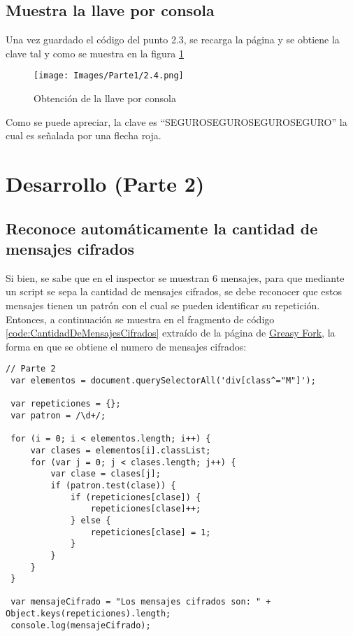 \documentclass[letter,12pt]{article}
\newcounter{codecount}
\begin{document}
\clearpage

\subsection{Muestra la llave por consola}

Una vez guardado el código del punto 2.3, se recarga la página y se obtiene la clave tal y como se muestra en la figura \ref{fig:2.4}

\begin{figure}[H]
    \centering
    \texttt{[image: Images/Parte1/2.4.png]}
    \caption{Obtención de la llave por consola}
    \label{fig:2.4}
\end{figure}

Como se puede apreciar, la clave es ``SEGUROSEGUROSEGUROSEGURO'' la cual es señalada por una flecha roja.

\clearpage

\section{Desarrollo (Parte 2)}

\subsection{Reconoce automáticamente la cantidad de mensajes cifrados}

Si bien, se sabe que en el inspector se muestran 6 mensajes, para que mediante un script se sepa la cantidad de mensajes cifrados, se debe reconocer que estos mensajes tienen un patrón con el cual se pueden identificar su repetición. Entonces, a continuación se muestra en el fragmento de código \ref{code:CantidadDeMensajesCifrados} extraído de la página de \href{https://greasyfork.org/es/scripts/479454-cryptojs/code}{Greasy Fork}, la forma en que se obtiene el numero de mensajes cifrados: \\

\label{code:CantidadDeMensajesCifrados}
\begin{lstlisting}[caption= Muestra la cantidad de mensajes cifrados, label=lst:javascript_example]
 // Parte 2
 var elementos = document.querySelectorAll('div[class^="M"]');

 var repeticiones = {};
 var patron = /\d+/;

 for (i = 0; i < elementos.length; i++) {
     var clases = elementos[i].classList;
     for (var j = 0; j < clases.length; j++) {
         var clase = clases[j];
         if (patron.test(clase)) {
             if (repeticiones[clase]) {
                 repeticiones[clase]++;
             } else {
                 repeticiones[clase] = 1;
             }
         }
     }
 }

 var mensajeCifrado = "Los mensajes cifrados son: " + Object.keys(repeticiones).length;
 console.log(mensajeCifrado);

\end{lstlisting}
\end{document}
